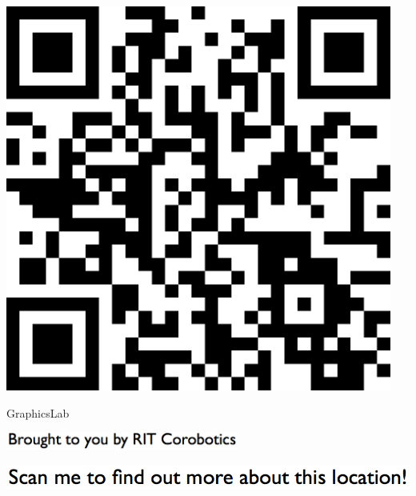 \documentclass[letterpaper]{article}
\begin{document}
 \begingroup 
 \centerline{\includegraphics[scale=1,width=5in,height=5in]{GraphicsLab.png}} 
 \endgroup 
 \vspace*{\fill} 

 \hfill{\small GraphicsLab} 

  \vspace{0.7in} 
 
 \centerline{\includegraphics[scale=1,width=3in]{text-bottom.png}} 
 
 \pagebreak 
{} 
 \vspace*{\fill} 
 
  \centerline{\includegraphics[scale=1,width=6in]{text-top.png}} 
 
 \vspace{0.5in} 
 
\end{document}
